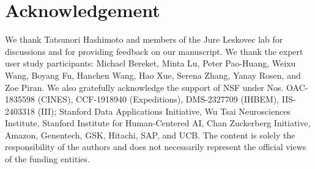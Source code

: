\section*{Acknowledgement}
We thank Tatsunori Hashimoto and members of the Jure Leskovec lab for discussions and for providing feedback on our manuscript. We thank the expert user study participants: Michael Bereket, Minta Lu, Peter Pao-Huang, Weixu Wang, Boyang Fu, Hanchen Wang, Hao Xue, Serena Zhang, Yanay Rosen, and Zoe Piran.
We also gratefully acknowledge the support of
NSF under Nos. OAC-1835598 (CINES), CCF-1918940 (Expeditions), DMS-2327709 (IHBEM), IIS-2403318 (III);
Stanford Data Applications Initiative,
Wu Tsai Neurosciences Institute,
Stanford Institute for Human-Centered AI,
Chan Zuckerberg Initiative,
Amazon, Genentech, GSK, Hitachi, SAP, and UCB.
The content is solely the responsibility of the authors and does not necessarily represent the official views of the funding entities.

